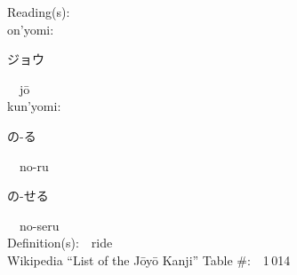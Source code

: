\begin{multicols}{2}
Reading(s):\ \ \\
{\hspace*{1em}}on'yomi:\ \ \\
{\hspace*{2em}}{\begin{CJK}{UTF8}{min} ジョウ \end{CJK}}\ \ j\=o\ \ \\
{\hspace*{1em}}kun'yomi:\ \ \\
{\hspace*{2em}}{\begin{CJK}{UTF8}{min} の-る \end{CJK}}\ \ no-ru\ \ \\
{\hspace*{2em}}{\begin{CJK}{UTF8}{min} の-せる \end{CJK}}\ \ no-seru\ \ \\
Definition(s):\ \ ride \\
Wikipedia ``List of the J\=oy\=o Kanji'' Table \#:\ \ 1\,014 \\
\ \ \\
\end{multicols}



